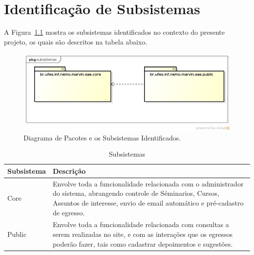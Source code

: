 \chapter{ Identificação de Subsistemas}
\label{sec-subsistemas}

A Figura~\ref{figura-subsistema} mostra os subsistemas identificados no contexto do presente projeto, os quais são descritos na tabela abaixo.




\begin{figure}[h]
  \centering
  \includegraphics[width=1\textwidth]{figuras/fig-projeto-diagrama-pacotes}
  \caption{Diagrama de Pacotes e os Subsistemas Identificados.}
  \label{figura-subsistema}
\end{figure} 





\begin{table}[h]
	\centering	
	\vspace{0.5cm}
	
	\begin{tabular}{|p{3cm}|p{12cm}|}  \hline \rowcolor[rgb]{0.8,0.8,0.8}
	
 		Subsistema & Descrição \\\hline 
 		                             
		Core & Envolve toda a funcionalidade relacionada com o administrador do sistema, abrangendo controle de Séminarios, Cursos, Assuntos de interesse, envio de email automático e pré-cadastro de egresso. \\\hline
		                              
		Public & Envolve toda a funcionalidade relacionada com consultas a serem realizadas no site, e com as interações que os egressos poderão fazer, tais como cadastrar depoimentos e sugestões. \\\hline 
		
	\end{tabular}
	\caption{ Subsistemas}	
\end{table}

